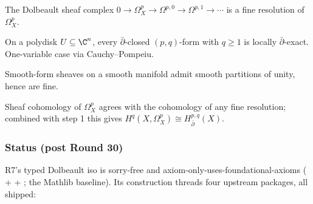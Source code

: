 \begin{lemma}
\label{lem:dolbeault-fine-resolution}
The Dolbeault sheaf complex $0 \to \Omega^{p}_{X} \to \Omega^{p,0} \to \Omega^{p,1} \to \cdots$ is a fine resolution of $\Omega^{p}_{X}$.
\leanok
\end{lemma}

\begin{lemma}
\label{lem:dolbeault-dbar-poincare}
On a polydisk $U \subseteq \C^{n}$, every $\bar\partial$-closed $(p, q)$-form with $q \geq 1$ is locally $\bar\partial$-exact.  One-variable case via Cauchy--Pompeiu.
\leanok
\end{lemma}

\begin{lemma}
\label{lem:dolbeault-fine-sheaves}
Smooth-form sheaves on a smooth manifold admit smooth partitions of unity, hence are fine.
\leanok
\end{lemma}

\begin{lemma}
\label{lem:dolbeault-fine-resolution-cohomology}
Sheaf cohomology of $\Omega^{p}_{X}$ agrees with the cohomology of any fine resolution; combined with step 1 this gives $H^{q}(X, \Omega^{p}_{X}) \cong H^{p,q}_{\bar\partial}(X)$.
\leanok
\end{lemma}

\subsubsection*{Status (post Round 30)}

R7's typed Dolbeault iso
 is sorry-free and
axiom-only-uses-foundational-axioms ( +
 + ; the Mathlib
baseline).  Its construction threads four upstream packages, all
shipped:

